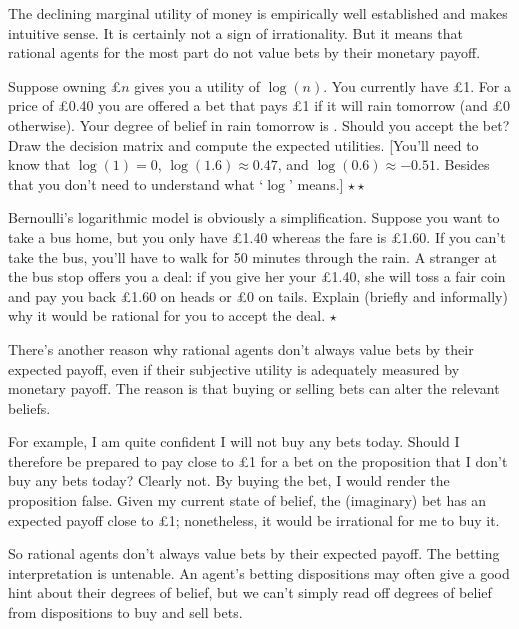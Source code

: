 The declining marginal utility of money is empirically well
established and makes intuitive sense. It is certainly not a sign of
irrationality. But it means that rational agents for the most part do
not value bets by their monetary payoff. 

\begin{exercise}
  Suppose owning £$n$ gives you a utility of $\log(n)$. You currently
  have £1. For a price of £0.40 you are offered a bet that pays £1 if
  it will rain tomorrow (and £0 otherwise). Your degree of belief in
  rain tomorrow is . Should you accept the bet?  Draw
  the decision matrix and compute the expected utilities. [You'll need
  to know that $\log(1) = 0$, $\log(1.6) \approx 0.47$, and $\log(0.6)
  \approx -0.51$. Besides that you don't need to understand what `$\log$'
  means.] $\star\star$
\end{exercise}

\begin{exercise}
  Bernoulli's logarithmic model is obviously a simplification. Suppose
  you want to take a bus home, but you only have £1.40 whereas the
  fare is £1.60. If you can't take the bus, you'll have to walk for 50
  minutes through the rain. A stranger at the bus stop offers you a
  deal: if you give her your £1.40, she will toss a fair coin and pay
  you back £1.60 on heads or £0 on tails. Explain (briefly and
  informally) why it would be rational for you to accept the deal. $\star$
\end{exercise}

There's another reason why rational agents don't always value bets by
their expected payoff, even if their subjective utility is adequately
measured by monetary payoff. The reason is that buying or selling bets
can alter the relevant beliefs. 

For example, I am quite confident I will not buy any bets
today. Should I therefore be prepared to pay close to £1 for a bet on
the proposition that I don't buy any bets today? Clearly not. By
buying the bet, I would render the proposition false. Given my current
state of belief, the (imaginary) bet has an expected payoff close to
£1; nonetheless, it would be irrational for me to buy it.

So rational agents don't always value bets by their expected
payoff. The betting interpretation is untenable. An agent's betting
dispositions may often give a good hint about their degrees of belief,
but we can't simply read off degrees of belief from dispositions to
buy and sell bets.

